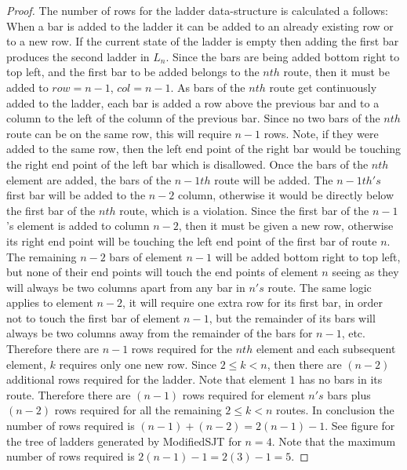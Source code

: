 \begin{proof}
  The number of rows for the ladder data-structure is calculated a follows: When a bar is added to the ladder it can be added 
  to an already existing row or to a new row. 
  If the current state of the ladder is empty then adding the first bar produces the second ladder in
  $L_{n}$. Since the bars are being added bottom right to top left, and the first bar to be added belongs 
  to the $nth$ route, then it must be added to $row=n-1$, $col=n-1$. As bars of the $nth$ route get 
  continuously added to the ladder, each bar is added a row above the previous bar and to a column 
  to the left of the column of the previous bar.
  Since no two bars of the $nth$ route can be on the same row, this will require $n-1$ rows. Note, if they were added to the same 
  row, then the left end point of the right bar would be touching the right end point of the left bar which is disallowed. Once the 
  bars of the $nth$ element are added, the bars of the $n-1th$ route will be added. The $n-1th's$ first bar 
  will be added to the $n-2$ column, otherwise it would be directly below the first bar of the $nth$ route, which is a violation. 
  Since the first bar of the $n-1$'s element is added to column $n-2$, then it must be given a new row, otherwise its right end point 
  will be touching  the left end point of the first bar of route $n$. The remaining $n-2$ bars of element $n-1$
  will be added bottom right to top left, but none of their end points will touch the end points of element $n$ seeing as they will 
  always be two columns apart from any bar in $n's$ route. The same logic applies to element $n-2$, it will require one extra row for its 
  first bar, in order not to touch the first bar of element $n-1$, but the remainder of its bars will always be two columns away from 
  the remainder of the bars for $n-1$, etc. Therefore there are $n-1$ rows required for the $nth$ element and each subsequent 
  element, $k$ requires only one new row. Since $2 \leq k < n$, then there are $(n-2)$ additional rows required for the ladder. Note that element 
  $1$ has no bars in its route. Therefore there are $(n-1)$ rows required for element $n's$ bars  plus $(n-2)$ rows required for 
  all the remaining $2 \leq k < n$ routes. In conclusion the number of rows required is $(n-1) + (n-2) = 2(n-1)-1$. 
  See figure for the tree of ladders 
  generated by {\sc ModifiedSJT} for $n=4$. Note that the maximum number of rows required is $2(n-1)-1=2(3)-1=5$.
\end{proof}



